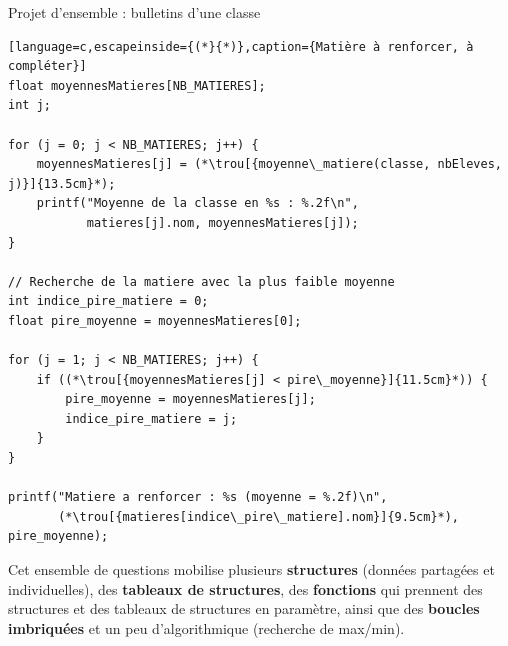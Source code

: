 \begin{UPSTIexercice}{Projet d'ensemble : bulletins d'une classe}
\begin{lstlisting}[language=c,escapeinside={(*}{*)},caption={Matière à renforcer, à compléter}]
float moyennesMatieres[NB_MATIERES];
int j;

for (j = 0; j < NB_MATIERES; j++) {
    moyennesMatieres[j] = (*\trou[{moyenne\_matiere(classe, nbEleves, j)}]{13.5cm}*);
    printf("Moyenne de la classe en %s : %.2f\n",
           matieres[j].nom, moyennesMatieres[j]);
}

// Recherche de la matiere avec la plus faible moyenne
int indice_pire_matiere = 0;
float pire_moyenne = moyennesMatieres[0];

for (j = 1; j < NB_MATIERES; j++) {
    if ((*\trou[{moyennesMatieres[j] < pire\_moyenne}]{11.5cm}*)) {
        pire_moyenne = moyennesMatieres[j];
        indice_pire_matiere = j;
    }
}

printf("Matiere a renforcer : %s (moyenne = %.2f)\n",
       (*\trou[{matieres[indice\_pire\_matiere].nom}]{9.5cm}*), pire_moyenne);
\end{lstlisting}

    Cet ensemble de questions mobilise plusieurs \textbf{structures} (données partagées et individuelles),
    des \textbf{tableaux de structures}, des \textbf{fonctions} qui prennent des structures et des tableaux
    de structures en paramètre, ainsi que des \textbf{boucles imbriquées} et un peu d'algorithmique
    (recherche de max/min).
\end{UPSTIexercice}



